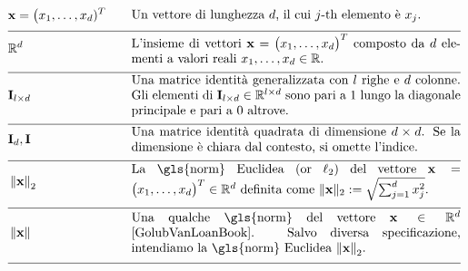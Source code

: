 \begin{align} 
	 &\featurevec=\big(\feature_{1},\ldots,\feature_{\featuredim})^{T} &\quad & \parbox{.75\textwidth}{Un vettore di lunghezza $\featuredim$, il cui
		$\featureidx$-th elemento è $\feature_{\featureidx}$.} \nonumber \\[2mm] \hline \nonumber\\[-5mm]
	&\mathbb{R}^{\featuredim} & \quad &  \parbox{.75\textwidth}{L'insieme di vettori $\featurevec=\big(\feature_{1},\ldots,\feature_{\featurelen}\big)^{T}$ composto da $\featuredim$ elementi a valori reali $\feature_{1},\ldots,\feature_{\featurelen} \in \mathbb{R}$.} \nonumber \\[2mm] \hline \nonumber\\[-5mm]
	&\mathbf{I}_{\modelidx \times \featuredim}  & \quad &  \parbox{.75\textwidth}{Una matrice identità generalizzata con $\modelidx$ righe e $\featuredim$ colonne. Gli elementi di $\mathbf{I}_{\modelidx \times \featuredim} \in \mathbb{R}^{\modelidx \times \featuredim}$ 
		sono pari a $1$ lungo la diagonale principale e pari a $0$ altrove. }\nonumber \\[2mm] \hline \nonumber\\[-5mm] %
	&\mathbf{I}_{\dimlocalmodel}, \mathbf{I} & \quad &  \parbox{.75\textwidth}{Una matrice identità quadrata di dimensione $\dimlocalmodel \times \dimlocalmodel$. Se la dimensione è chiara dal contesto, si omette l'indice.} \nonumber \\[2mm] \hline \nonumber\\[-5mm]
	&\normgeneric{\featurevec}{2}  &\quad & \parbox{.75\textwidth}{La \gls{norm} Euclidea (or $\ell_{2}$) del vettore 
		$\featurevec=\big(\feature_{1},\ldots,\feature_{\featurelen}\big)^{T} \in \mathbb{R}^{\featuredim}$ definita come $ \| \featurevec \|_{2} \defeq \sqrt{\sum_{\featureidx=1}^{\featuredim} \feature_{\featureidx}^{2}}$.} \nonumber \\[2mm] \hline \nonumber\\[-5mm] 
	&\normgeneric{\featurevec}{}  & \quad &  \parbox{.75\textwidth}{Una qualche \gls{norm} del vettore $\featurevec \in \mathbb{R}^{\featuredim}$ \cite{GolubVanLoanBook}. Salvo diversa specificazione, intendiamo la \gls{norm} Euclidea $\normgeneric{\featurevec}{2}$.} \nonumber \\[2mm] \hline \nonumber\\[-5mm]

\end{align}
